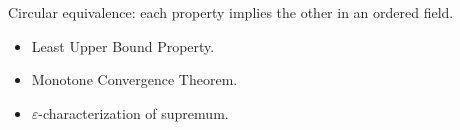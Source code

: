 \begin{remark*}
Circular equivalence: each property implies the other in an ordered field.
\end{remark*}

\begin{remark*}[Dependencies]
\begin{itemize}
  \item Least Upper Bound Property.
  \item Monotone Convergence Theorem.
  \item $\varepsilon$-characterization of supremum.
\end{itemize}
\end{remark*}
